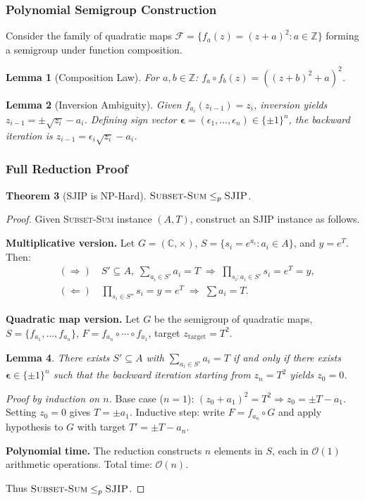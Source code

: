 \documentclass[journal,twocolumn]{IEEEtran}
\theoremstyle{definition}
\theoremstyle{plain}
\newtheorem{theorem}{Theorem}[section]
\newtheorem{lemma}[theorem]{Lemma}
\newcommand{\C}{\mathbb{C}}
\newcommand{\Z}{\mathbb{Z}}
\begin{document}
\subsubsection{Polynomial Semigroup Construction}

Consider the family of quadratic maps
$\mathcal{F}=\{f_a(z)=(z+a)^2:a\in\Z\}$ forming a semigroup under
function composition.

\begin{lemma}[Composition Law]
For $a,b\in\Z$: $f_a\circ f_b(z)=((z+b)^2+a)^2$.
\end{lemma}

\begin{lemma}[Inversion Ambiguity]
Given $f_{a_i}(z_{i-1})=z_i$, inversion yields
$z_{i-1}=\pm\sqrt{z_i}-a_i$. Defining sign vector
$\boldsymbol\epsilon=(\epsilon_1,\dots,\epsilon_n)\in\{{\pm1}\}^n$, the
backward iteration is $z_{i-1}=\epsilon_i\sqrt{z_i}-a_i$.
\end{lemma}

\subsubsection{Full Reduction Proof}

\begin{theorem}[SJIP is NP-Hard]
\label{thm:sjip_nphard}
$\textsc{Subset-Sum}\le_p\textsc{SJIP}$.
\end{theorem}

\begin{proof}
Given \textsc{Subset-Sum} instance $(A,T)$, construct an SJIP instance
as follows.

\textbf{Multiplicative version.} Let $G=(\C,\times)$,
$S=\{s_i=e^{a_i}:a_i\in A\}$, and $y=e^T$. Then:
\begin{align*}
  &(\Rightarrow)\quad S'\subseteq A,\;\sum_{a_i\in S'}a_i=T\;\Longrightarrow\;
  \prod_{s_i:a_i\in S'}s_i=e^T=y,\\
  &(\Leftarrow)\quad\prod_{s_i\in S''}s_i=y=e^T\;\Longrightarrow\;
  \sum a_i=T.
\end{align*}

\textbf{Quadratic map version.} Let $G$ be the semigroup of quadratic
maps, $S=\{f_{a_1},\dots,f_{a_n}\}$,
$F=f_{a_n}\circ\cdots\circ f_{a_1}$, target $z_{\mathrm{target}}=T^2$.

\begin{lemma}
There exists $S'\subseteq A$ with $\sum_{a_i\in S'}a_i=T$ if and only
if there exists $\boldsymbol\epsilon\in\{{\pm1}\}^n$ such that the
backward iteration starting from $z_n=T^2$ yields $z_0=0$.
\end{lemma}

\textit{Proof by induction on $n$.} Base case ($n=1$):
$(z_0+a_1)^2=T^2\Rightarrow z_0=\pm T-a_1$. Setting $z_0=0$ gives
$T=\pm a_1$. Inductive step: write $F=f_{a_n}\circ G$ and apply
hypothesis to $G$ with target $T'=\pm T-a_n$.

\textbf{Polynomial time.} The reduction constructs $n$ elements in $S$,
each in $\mathcal{O}(1)$ arithmetic operations. Total time:
$\mathcal{O}(n)$.

Thus $\textsc{Subset-Sum}\le_p\textsc{SJIP}$.
\end{proof}
\end{document}
